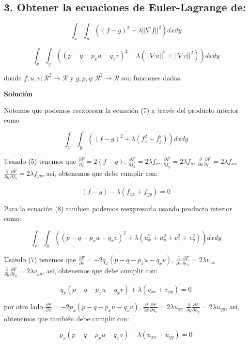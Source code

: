 \documentclass[conference]{IEEEtran}
\begin{document}
\subsection*{3. Obtener la ecuaciones de Euler-Lagrange de:}

\begin{equation}
    \int_x \int_y ((f-g)^2 + \lambda ||\nabla f||^2) dx dy
\end{equation}

\begin{equation}
    \int_x \int_y ( (p-q-p_xu-q_xv)^2 + \lambda (||\nabla u||^2 + ||\nabla v||^2) ) dx dy
\end{equation}

donde $f,u,v: \mathcal{R}^2 \rightarrow \mathcal{R}$ y
$g,p,q: \mathcal{R}^2 \rightarrow \mathcal{R}$ son funciones dadas.


\textbf{Solución}

Notemos que podemos reexpresar la ecuación (7) a través del producto interior como

$$
\int_x \int_y ((f-g)^2 + \lambda (f_x^2 - f_y^2)) dx dy
$$

Usando (5) tenemos que $\frac{\partial F}{\partial f} = 2(f-g)$,
$\frac{\partial F}{\partial f_x} = 2\lambda f_x$,
$\frac{\partial F}{\partial f_y} = 2\lambda f_y$,
$\frac{\partial}{\partial x}\frac{\partial F}{\partial f_x} = 2\lambda f_{xx}$
$\frac{\partial}{\partial y}\frac{\partial F}{\partial f_y} = 2\lambda f_{yy}$, así, obtenemos que
debe cumplir con:

$$
(f-g) - \lambda(f_{xx} + f_{yy}) = 0
$$

Para la ecuación (8) tambien podemos reexpresarla usando producto interior como:

$$
    \int_x \int_y ( (p-q-p_xu-q_xv)^2 + \lambda (u_x^2 + u_y^2 + v_x^2 + v_y^2) ) dx dy
$$

Usando (7) tenemos que $\frac{\partial F}{\partial v} = -2q_x(p-q-p_xu-q_xv)$,
$\frac{\partial}{\partial x}\frac{\partial F}{\partial v_x} = 2\lambda v_{xx}$
$\frac{\partial}{\partial y}\frac{\partial F}{\partial v_y} = 2\lambda v_{yy}$, así, obtenemos que
debe cumplir con:

$$
q_x(p-q-p_xu-q_xv) + \lambda (v_{xx} + v_{yy}) = 0
$$

por otro lado $\frac{\partial F}{\partial u} = -2p_x(p-q-p_xu-q_xv)$,
$\frac{\partial}{\partial x}\frac{\partial F}{\partial u_x} = 2\lambda u_{xx}$
$\frac{\partial}{\partial y}\frac{\partial F}{\partial u_y} = 2\lambda u_{yy}$, así, obtenemos
que también debe cumplir con:

$$
p_x(p-q-p_xu-q_xv) + \lambda (u_{xx} + u_{yy}) = 0
$$
\end{document}
